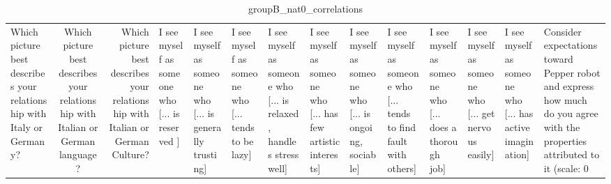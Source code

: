 \begin{table}
\caption{groupB_nat0_correlations}
\label{tab:groupB_nat0_correlations}
\begin{tabular}{lcr}
\toprule
Which picture best describes your relationship with Italy or Germany? & Which picture best describes your relationship with Italian or German language? & Which picture best describes your relationship with Italian or German Culture? & I see myself as someone who  [... is reserved ] & I see myself as someone who  [... is generally trusting] & I see myself as someone who  [... tends to be lazy] & I see myself as someone who  [... is relaxed, handles stress well] & I see myself as someone who  [... has few artistic interests] & I see myself as someone who  [... is ongoing, sociable] & I see myself as someone who  [... tends to find fault with others] & I see myself as someone who  [... does a thorough job] & I see myself as someone who  [... get nervous easily] & I see myself as someone who  [... has active imagination] & Consider expectations toward Pepper robot and express how much do you agree with the properties attributed to it (scale: 0%
\end{tabular}
\end{table}
